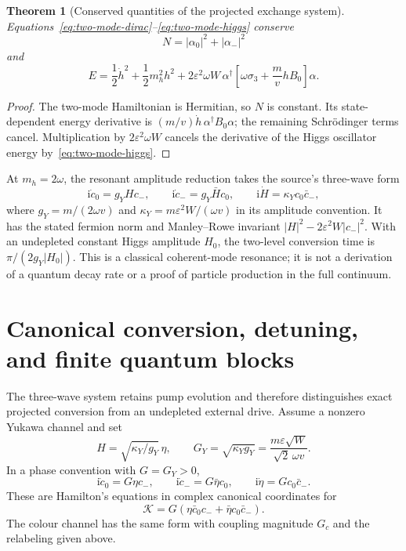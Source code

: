 \documentclass[11pt,a4paper,oneside]{book}
\theoremstyle{plain}
\newtheorem{theorem}{Theorem}[chapter]
\theoremstyle{definition}
\theoremstyle{remark}
\newcommand{\ii}{\mathrm i}
\newcommand{\src}[2]{\cite{#1}}
\begin{document}
\begin{theorem}[Conserved quantities of the projected exchange system]
\label{thm:yukawa-exchange}
Equations~\eqref{eq:two-mode-dirac}--\eqref{eq:two-mode-higgs} conserve
\begin{equation}
 N=|\alpha_0|^2+|\alpha_-|^2
\end{equation}
and
\begin{equation}
 E=\frac12\dot h^2+\frac12m_h^2h^2
 +2\varepsilon^2\omega W\,
 \alpha^\dagger\left[\omega\sigma_3+\frac mvhB_0\right]\alpha.
 \label{eq:yukawa-energy}
\end{equation}
\end{theorem}
\begin{proof}
The two-mode Hamiltonian is Hermitian, so $N$ is constant. Its state-dependent energy derivative is $(m/v)\dot h\,\alpha^\dagger B_0\alpha$; the remaining Schr\"odinger terms cancel. Multiplication by $2\varepsilon^2\omega W$ cancels the derivative of the Higgs oscillator energy by~\eqref{eq:two-mode-higgs}.
\end{proof}
\src{R20}{thm:v20v23-subspace,thm:v20v23-coupled}

At $m_h=2\omega$, the resonant amplitude reduction takes the source's three-wave form
\begin{equation}
 \ii\dot c_0=g_Y Hc_-,\qquad
 \ii\dot c_-=g_Y\bar Hc_0,\qquad
 \ii\dot H=\kappa_Yc_0\bar c_-,
 \label{eq:yukawa-resonance}
\end{equation}
where $g_Y=m/(2\omega v)$ and $\kappa_Y=m\varepsilon^2W/(\omega v)$ in its amplitude convention. It has the stated fermion norm and Manley--Rowe invariant $|H|^2-2\varepsilon^2W|c_-|^2$. With an undepleted constant Higgs amplitude $H_0$, the two-level conversion time is $\pi/(2g_Y|H_0|)$. This is a classical coherent-mode resonance; it is not a derivation of a quantum decay rate or a proof of particle production in the full continuum. \cite{R20}

\section{Canonical conversion, detuning, and finite quantum blocks}
\label{sec:canonical-conversion}
The three-wave system retains pump evolution and therefore distinguishes
exact projected conversion from an undepleted external drive.  Assume a
nonzero Yukawa channel and set
\begin{equation}
 H=\sqrt{\kappa_Y/g_Y}\,\eta,\qquad
 G_Y=\sqrt{\kappa_Yg_Y}
     =\frac{m\varepsilon\sqrt W}{\sqrt2\,\omega v}.
 \label{eq:canonical-yukawa-coupling}
\end{equation}
In a phase convention with $G=G_Y>0$,
\begin{equation}
 \ii\dot c_0=G\eta c_-,\qquad
 \ii\dot c_-=G\bar\eta c_0,\qquad
 \ii\dot\eta=Gc_0\bar c_-.
 \label{eq:canonical-triad}
\end{equation}
These are Hamilton's equations in complex canonical coordinates for
\begin{equation}
 \mathcal K=G(\eta\bar c_0c_-+\bar\eta c_0\bar c_-).
 \label{eq:triad-hamiltonian}
\end{equation}
The colour channel has the same form with coupling magnitude $G_c$ and
the relabeling given above.  \src{R20}{prop:v20v26-canonical}
\end{document}
